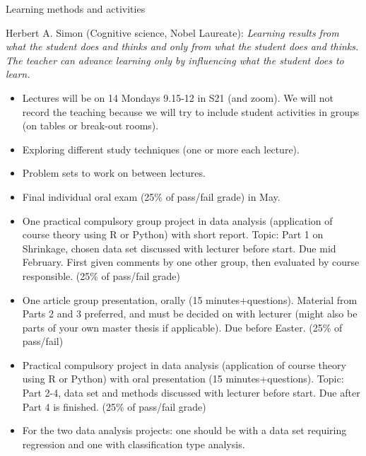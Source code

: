 \documentclass[
  ignorenonframetext,
]{beamer}
\begin{document}
\begin{frame}{Learning methods and activities}
\protect\hypertarget{learning-methods-and-activities}{}

Herbert A. Simon (Cognitive science, Nobel Laureate): \emph{Learning
results from what the student does and thinks and only from what the
student does and thinks. The teacher can advance learning only by
influencing what the student does to learn.}

\begin{itemize}
\item
  Lectures will be on 14 Mondays 9.15-12 in S21 (and zoom). We will not
  record the teaching because we will try to include student activities
  in groups (on tables or break-out rooms).
\item
  Exploring different study techniques (one or more each lecture).
\item
  Problem sets to work on between lectures.
\item
  Final individual oral exam (25\% of pass/fail grade) in May.
\end{itemize}

\end{frame}

\begin{frame}

\begin{itemize}
\item
  One practical compulsory group project in data analysis (application
  of course theory using R or Python) with short report. Topic: Part 1
  on Shrinkage, chosen data set discussed with lecturer before start.
  Due mid February. First given comments by one other group, then
  evaluated by course responsible. (25\% of pass/fail grade)
\item
  One article group presentation, orally (15 minutes+questions).
  Material from Parts 2 and 3 preferred, and must be decided on with
  lecturer (might also be parts of your own master thesis if
  applicable). Due before Easter. (25\% of pass/fail)
\item
  Practical compulsory project in data analysis (application of course
  theory using R or Python) with oral presentation (15
  minutes+questions). Topic: Part 2-4, data set and methods discussed
  with lecturer before start. Due after Part 4 is finished. (25\% of
  pass/fail grade)
\item
  For the two data analysis projects: one should be with a data set
  requiring regression and one with classification type analysis.
\end{itemize}

\end{frame}
\end{document}
